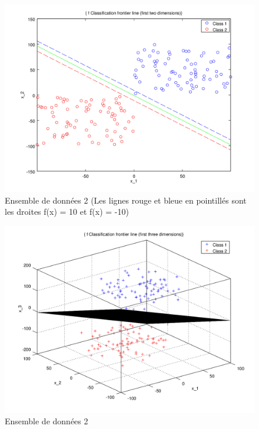 \documentclass{article}
\begin{document}
         \begin{figure}[H]
           \begin{center}
             \includegraphics[scale=0.5]{images/line2.png}
             \caption{Ensemble de données 2 (Les lignes rouge et bleue en pointillés sont les droites f(x) = 10 et f(x) = -10)}
           \end{center}
         \end{figure}

         \begin{figure}[H]
           \begin{center}
             \includegraphics[scale=0.5]{images/plane2.png}
             \caption{Ensemble de données 2}
           \end{center}
         \end{figure}
\end{document}
